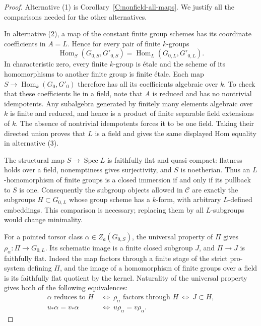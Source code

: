 \begin{proof}
Alternative (1) is Corollary~\ref{C:nonfield-all-maps}.  We justify
all the comparisons needed for the other alternatives.

In alternative (2), a map of the constant finite group schemes has
its coordinate coefficients in $A=L$.  Hence for every pair of
finite $k$-groups
\[
\operatorname{Hom}_S(G_{0,S},G'_{0,S})
=\operatorname{Hom}_L(G_{0,L},G'_{0,L}).
\]
In characteristic zero, every finite $k$-group is \'etale and the
scheme of its homomorphisms to another finite group is finite
\'etale.  Each map $S\to\operatorname{Hom}_k(G_0,G'_0)$ therefore
has all its coefficients algebraic over $k$.
To check that these coefficients lie in a field, note that $A$ is
reduced and has no nontrivial idempotents.  Any subalgebra generated
by finitely many elements algebraic over $k$ is finite and reduced,
and hence is a product of finite separable field extensions of $k$.
The absence of nontrivial idempotents forces it to be one field.
Taking their directed union proves that $L$ is a field and gives the
same displayed Hom equality in alternative (3).

The structural map $S\to\operatorname{Spec}L$ is faithfully flat
and quasi-compact: flatness holds over a field, nonemptiness gives
surjectivity, and $S$ is noetherian.  Thus an $L$-homomorphism of
finite groups is a closed immersion if and only if its pullback to
$S$ is one.  Consequently the subgroup objects allowed in
$\mathcal C$ are exactly the subgroups $H\subset G_{0,L}$ whose
group scheme has a $k$-form, with arbitrary $L$-defined embeddings.
This comparison is necessary; replacing them by all $L$-subgroups
would change minimality.

For a pointed torsor class $\alpha\in Z_a(G_{0,S})$, the universal
property of $\Pi$ gives
$\rho_\alpha\colon\Pi\to G_{0,L}$.  Its schematic image is a finite
closed subgroup $J$, and $\Pi\to J$ is faithfully flat.  Indeed the
map factors through a finite stage of the strict pro-system defining
$\Pi$, and the image of a homomorphism of finite groups over a
field is its faithfully flat quotient by the kernel.  Naturality of
the universal property gives both of the following equivalences:
\[
\begin{aligned}
\alpha\text{ reduces to }H
&\ \Longleftrightarrow\ \rho_\alpha\text{ factors through }H
\ \Longleftrightarrow\ J\subset H,\\
u_*\alpha=v_*\alpha
&\ \Longleftrightarrow\ u\rho_\alpha=v\rho_\alpha.
\end{aligned}
\]


\end{proof}
